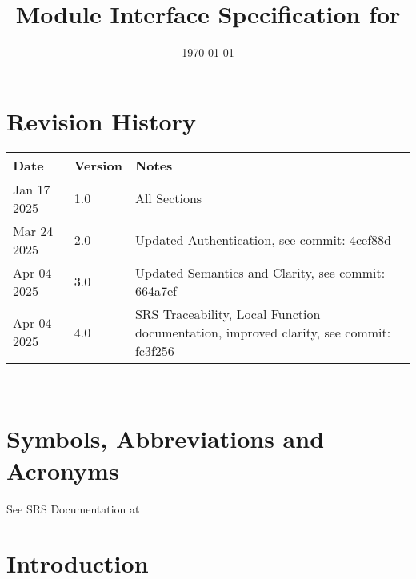 \documentclass[12pt, titlepage]{article}
\begin{document}
\title{Module Interface Specification for \progname{}}

\author{\authname}

\date{\today}

\maketitle


\section{Revision History}

\begin{tabularx}{\textwidth}{p{3cm}p{2cm}X}
\toprule {\bf Date} & {\bf Version} & {\bf Notes}\\
\midrule
Jan 17 2025 & 1.0 & All Sections\\
Mar 24 2025 & 2.0 & Updated Authentication, see commit: \href{https://github.com/ausbennett/mes-finance-platform/commit/4cef88de4d7c2a664fa8e2395804251c0a6baeb4}{4cef88d}\\
Apr 04 2025 & 3.0 & Updated Semantics and Clarity, see commit: \href{https://github.com/ausbennett/mes-finance-platform/commit/664a7ef2b06300b5369cd2389521290300d42d79}{664a7ef}\\
Apr 04 2025 & 4.0 & SRS Traceability, Local Function documentation, improved clarity, see commit: \href{https://github.com/ausbennett/mes-finance-platform/commit/fc3f2565e7361cf60c64a4f74fd15e45f70fc6b7}{fc3f256}\\
\bottomrule
\end{tabularx}

~\newpage

\section{Symbols, Abbreviations and Acronyms}

See SRS Documentation at 


\newpage

\tableofcontents

\newpage


\section{Introduction}
\end{document}
